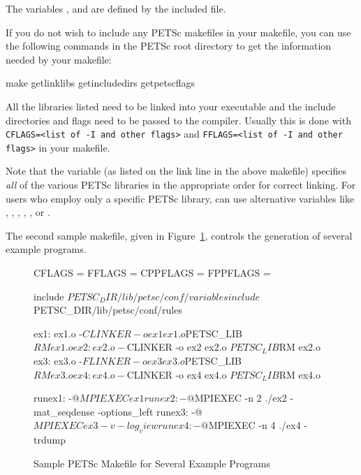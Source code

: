 {{{The variables , 
and  are defined by the included  file.

If you do not wish to include any PETSc makefiles in your makefile,
you can use the following commands in the PETSc root directory to get the information
needed by your makefile: 
\begin{bashlisting}
make getlinklibs getincludedirs getpetscflags
\end{bashlisting}
All the libraries listed need to be linked into your executable and the
include directories and flags need to be passed to the compiler.
Usually this is done with \lstinline{CFLAGS=<list of -I and other flags>} and
\lstinline{FFLAGS=<list of -I and other flags>} in your makefile.

 
Note that the variable  (as listed on the link
line in the above makefile) specifies {\em all} of the various PETSc
libraries in the appropriate order for correct linking.  For users who
employ only a specific PETSc library, can use alternative variables
like  , ,
, ,
,  or
.

The second sample makefile, given in Figure~\ref{fig_make2},
controls the generation of several example programs.

\begin{figure}[H]
\begin{makelisting}
   CFLAGS   =
   FFLAGS   =
   CPPFLAGS =
   FPPFLAGS =

   include ${PETSC_DIR}/lib/petsc/conf/variables
   include ${PETSC_DIR}/lib/petsc/conf/rules

   ex1: ex1.o
        -${CLINKER} -o ex1 ex1.o  ${PETSC_LIB}
        ${RM} ex1.o
   ex2: ex2.o
        -${CLINKER} -o ex2 ex2.o  ${PETSC_LIB}
        ${RM} ex2.o
   ex3: ex3.o
        -${FLINKER} -o ex3 ex3.o  ${PETSC_LIB}
        ${RM} ex3.o
   ex4: ex4.o
        -${CLINKER} -o ex4 ex4.o  ${PETSC_LIB}
        ${RM} ex4.o

   runex1:
        -@${MPIEXEC} ex1
   runex2:
        -@${MPIEXEC} -n 2 ./ex2 -mat_seqdense -options_left
   runex3:
        -@${MPIEXEC} ex3 -v -log_view
   runex4:
        -@${MPIEXEC} -n 4 ./ex4 -trdump
\end{makelisting}
\caption{Sample PETSc Makefile for Several Example Programs}
\label{fig_make2}
\end{figure}

}}}
